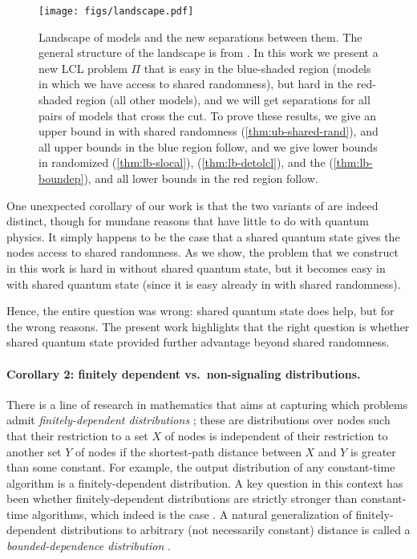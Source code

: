 \documentclass[11pt]{article}
\begin{document}
\begin{figure}[t]
	\centering
	\texttt{[image: figs/landscape.pdf]}
	\caption{Landscape of models and the new separations between them. The general structure of the landscape is from \cite{akbari24_online_arxiv}. In this work we present a new LCL problem $\Pi$ that is easy in the blue-shaded region (models in which we have access to shared randomness), but hard in the red-shaded region (all other models), and we will get separations for all pairs of models that cross the cut. To prove these results, we give an upper bound in \randlcl with shared randomness (\cref{thm:ub-shared-rand}), and all upper bounds in the blue region follow, and we give lower bounds in randomized \slocal (\cref{thm:lb-slocal}), \detolcl (\cref{thm:lb-detolcl}), and the \boundep (\cref{thm:lb-boundep}), and all lower bounds in the red region follow.}
  	\label{fig:landscape}
\end{figure}

One unexpected corollary of our work is that the two variants of \qlocal are
indeed distinct, though for mundane reasons that have little to do with quantum
physics. It simply happens to be the case that a shared quantum state gives the
nodes access to shared randomness. As we show, the problem that we construct in
this work is hard in \qlocal without shared quantum state, but it becomes easy
in \qlocal with shared quantum state (since it is easy already in \randlcl with
shared randomness).

Hence, the entire question was wrong: shared quantum state does help, but for the wrong reasons. The present work highlights that the right question is whether shared quantum state provided further advantage beyond shared randomness.

\paragraph{Corollary 2: finitely dependent vs.\ non-signaling distributions.}

There is a line of research in mathematics that aims at capturing which problems
admit \emph{finitely-dependent distributions}
\cite{holroyd2016,holroyd2018,holroyd2023symmetrization,timar2024}; these are
distributions over nodes such that their restriction to a
set $X$ of nodes is independent of their restriction to another set $Y$ of
nodes if the shortest-path distance between $X$ and $Y$ is greater than some
constant. For example, the output distribution of any constant-time \randlcl
algorithm is a finitely-dependent distribution. A key question in this
context has been whether finitely-dependent distributions are strictly stronger
than constant-time \randlcl algorithms, which indeed is the case
\cite{holroyd2016}. A natural generalization of finitely-dependent distributions
to arbitrary (not necessarily constant) distance is called a
\emph{bounded-dependence distribution} \cite{akbari24_online_arxiv}.
\end{document}
